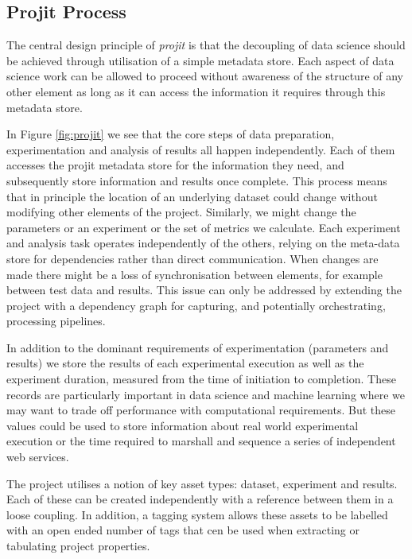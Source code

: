 \documentclass[sigconf]{acmart}
\begin{document}
\subsection{Projit Process}

The central design principle of \textit{projit} is that the decoupling of data science 
should be achieved through utilisation of a simple metadata store. Each aspect of 
data science work can be allowed to proceed without awareness of the structure of 
any other element as long as it can access the information it requires through this
metadata store.

In Figure \ref{fig:projit} we see that the core steps of data preparation, experimentation
and analysis of results all happen independently. Each of them accesses the projit metadata 
store for the information they need, and subsequently store information and results once 
complete. This process means that in principle the location of an underlying dataset 
could change without modifying other elements of the project. Similarly, we might change 
the parameters or an experiment or the set of metrics we calculate. Each experiment and 
analysis task operates independently of the others, relying on the meta-data store for 
dependencies rather than direct communication. When changes are made there might be a
loss of synchronisation between elements, for example between test data and results. 
This issue can only be addressed by extending the project with a dependency graph for 
capturing, and potentially orchestrating, processing pipelines.

In addition to the dominant requirements of experimentation (parameters and results) we 
store the results of each experimental execution as well as the experiment duration, 
measured from the time of initiation to completion. These records are particularly 
important in data science and machine learning where we may want to trade off 
performance with computational requirements. But these values could be used to store
information about real world experimental execution or the time required to marshall 
and sequence a series of independent web services. 

The project utilises a notion of key asset types: dataset, experiment and results. Each
of these can be created independently with a reference between them in a loose coupling.
In addition, a tagging system allows these assets to be labelled with an open ended number
of tags that cen be used when extracting or tabulating project properties.
\end{document}
